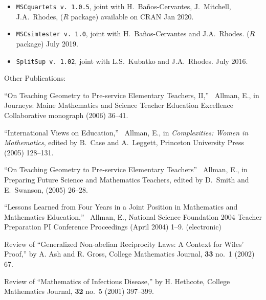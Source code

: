 \documentclass[10pt]{report}
\begin{document}
{\begin{itemize}
 \setlength{\itemsep}{2pt}
 \setlength{\parskip}{0pt}
 \setlength{\parsep}{0pt}
 
 \item {\tt MSCquartets v.~1.0.5}, joint with H.~Ba\~nos-Cervantes, J.~Mitchell, J.A.~Rhodes, ($R$ package) available
 on CRAN Jan 2020.
 
 \item {\tt MSCsimtester v.~1.0}, joint with H.~Ba\~nos-Cervantes and J.A.~Rhodes.  ($R$ package) July 2019.

 \item {\tt SplitSup v.~1.02}, joint with L.S.~Kubatko and J.A.~Rhodes.  July 2016.

 
 \end{itemize}
 
 \medskip


{\sc Other Publications:}

\smallskip

{\begin{revnumerate}[8]

 \setlength{\itemsep}{2pt}
 \setlength{\parskip}{0pt}
 \setlength{\parsep}{0pt}

\item
``On Teaching Geometry to Pre-service Elementary Teachers, II,'' \
Allman, E., in Journeys: Maine Mathematics and Science Teacher
Education Excellence Collaborative monograph (2006) 36--41.

\item
``International Views on Education,'' \ Allman, E., in {\it
Complexities: Women in Mathematics}, edited by B.~Case and
A.~Leggett, Princeton University Press (2005) 128--131.

\item
``On Teaching Geometry to Pre-service Elementary Teachers'' \ Allman,
E., in Preparing Future Science and Mathematics Teachers, edited by
D.~Smith and E.~Swanson, (2005) 26--28.

\item
``Lessons Learned from Four Years in a Joint Position in Mathematics
and Mathematics Education,'' \ Allman, E., National Science
Foundation 2004 Teacher Preparation PI Conference Proceedings (April
2004) 1--9. (electronic)

\item
Review of ``Generalized Non-abelian Reciprocity Laws: A Context for
Wiles' Proof,'' by A. Ash and R. Gross, College Mathematics Journal,
{\bf 33} no.~1 (2002) 67.

\item
Review of ``Mathematics of Infectious Disease,'' by H.  Hethcote,
College Mathematics Journal, {\bf 32} no.~5 (2001) 397--399.


\end{revnumerate}}}
\end{document}
